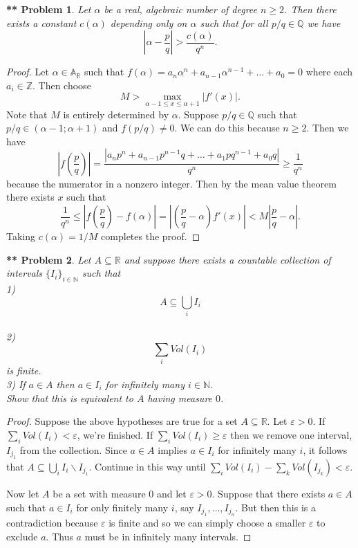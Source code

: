 \documentclass{article}
\newtheorem{**}{** Problem}
\begin{document}
\begin{flushleft}
\begin{**}
Let $\alpha$ be a real, algebraic number of degree $n \geq 2$. Then there exists a constant $c(\alpha)$ depending only on $\alpha$ such that for all $p/q \in \mathbb{Q}$ we have
\[
\left | \alpha - \frac{p}{q} \right | > \frac{c(\alpha)}{q^n}.
\]
\end{**}
\begin{proof}
Let $\alpha \in \mathbb{A}_{\mathbb{R}}$ such that $f(\alpha) = a_n \alpha^n + a_{n-1} \alpha^{n-1} + \dots + a_0 = 0$ where each $a_i \in \mathbb{Z}$. Then choose
\[
M > \max_{\alpha - 1 \leq x \leq \alpha + 1} |f'(x)|.
\]
Note that $M$ is entirely determined by $\alpha$. Suppose $p/q \in \mathbb{Q}$ such that $p/q \in (\alpha - 1 ; \alpha + 1)$ and $f(p/q) \neq 0$. We can do this because $n \geq 2$. Then we have
\[
\left | f \left (\frac{p}{q} \right ) \right | = \frac{|a_np^n + a_{n-1}p^{n-1}q + \dots + a_1pq^{n-1} + a_0 q|}{q^n} \geq \frac{1}{q^n}
\]
because the numerator in a nonzero integer. Then by the mean value theorem there exists $x$ such that
\[
\frac{1}{q^n} \leq \left |f \left ( \frac{p}{q} \right ) - f(\alpha) \right | = \left | \left ( \frac{p}{q} - \alpha \right ) f'(x) \right | < M \left |\frac{p}{q} - \alpha \right |.
\]
Taking $c(\alpha) = 1/M$ completes the proof.
\end{proof}

\begin{**}
Let $A \subseteq \mathbb{R}$ and suppose there exists a countable collection of intervals $\{I_i\}_{i \in \mathbb{N}}$ such that\\
1)
\[
A \subseteq \bigcup_i I_i
\]\\
2)
\[
\sum_i Vol(I_i)
\]
is finite.\\
3) If $a \in A$ then $a \in I_i$ for infinitely many $i \in \mathbb{N}$.\\
Show that this is equivalent to $A$ having measure $0$.
\end{**}
\begin{proof}
Suppose the above hypotheses are true for a set $A \subseteq \mathbb{R}$. Let $\varepsilon > 0$. If $\sum_i Vol (I_i) < \varepsilon$, we're finished. If $\sum_i Vol (I_i) \geq \varepsilon$ then we remove one interval, $I_{j_1}$ from the collection. Since $a \in A$ implies $a \in I_i$ for infinitely many $i$, it follows that $A \subseteq \bigcup_i I_i \backslash I_{j_1}$. Continue in this way until $\sum_i Vol(I_i) - \sum_k Vol(I_{j_k}) < \varepsilon$.\newline

Now let $A$ be a set with measure $0$ and let $\varepsilon > 0$. Suppose that there exists $a \in A$ such that $a \in I_i$ for only finitely many $i$, say $I_{j_1}, \dots , I_{j_n}$. But then this is a contradiction because $\varepsilon$ is finite and so we can simply choose a smaller $\varepsilon$ to exclude $a$. Thus $a$ must be in infinitely many intervals.
\end{proof}


\end{flushleft}
\end{document}
